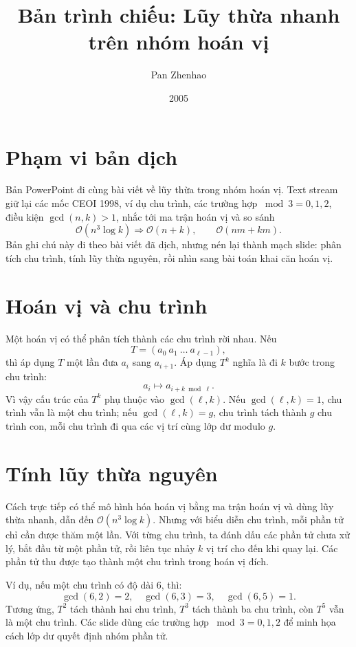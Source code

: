 \documentclass[11pt]{article}
\title{Bản trình chiếu: Lũy thừa nhanh trên nhóm hoán vị}
\author{Pan Zhenhao}
\date{2005}
\newcommand{\Oh}{\mathcal{O}}
\begin{document}
\maketitle


\section{Phạm vi bản dịch}

Bản PowerPoint đi cùng bài viết về lũy thừa trong nhóm hoán vị. Text stream
giữ lại các mốc CEOI 1998, ví dụ chu trình, các trường hợp
\(\bmod 3=0,1,2\), điều kiện \(\gcd(n,k)>1\), nhắc tới ma trận hoán vị và so
sánh
\[
  \Oh(n^3\log k)\Rightarrow \Oh(n+k),\qquad \Oh(nm+km).
\]
Bản ghi chú này đi theo bài viết đã dịch, nhưng nén lại thành mạch slide:
phân tích chu trình, tính lũy thừa nguyên, rồi nhìn sang bài toán khai căn
hoán vị.

\section{Hoán vị và chu trình}

Một hoán vị có thể phân tích thành các chu trình rời nhau. Nếu
\[
  T=(a_0\ a_1\ \ldots\ a_{\ell-1}),
\]
thì áp dụng \(T\) một lần đưa \(a_i\) sang \(a_{i+1}\). Áp dụng \(T^k\) nghĩa
là đi \(k\) bước trong chu trình:
\[
  a_i\mapsto a_{i+k\bmod \ell}.
\]
Vì vậy cấu trúc của \(T^k\) phụ thuộc vào \(\gcd(\ell,k)\). Nếu
\(\gcd(\ell,k)=1\), chu trình vẫn là một chu trình; nếu
\(\gcd(\ell,k)=g\), chu trình tách thành \(g\) chu trình con, mỗi chu trình đi
qua các vị trí cùng lớp dư modulo \(g\).

\section{Tính lũy thừa nguyên}

Cách trực tiếp có thể mô hình hóa hoán vị bằng ma trận hoán vị và dùng lũy
thừa nhanh, dẫn đến \(\Oh(n^3\log k)\). Nhưng với biểu diễn chu trình, mỗi
phần tử chỉ cần được thăm một lần. Với từng chu trình, ta đánh dấu các phần
tử chưa xử lý, bắt đầu từ một phần tử, rồi liên tục nhảy \(k\) vị trí cho đến
khi quay lại. Các phần tử thu được tạo thành một chu trình trong hoán vị
đích.

Ví dụ, nếu một chu trình có độ dài \(6\), thì:
\[
  \gcd(6,2)=2,\quad \gcd(6,3)=3,\quad \gcd(6,5)=1.
\]
Tương ứng, \(T^2\) tách thành hai chu trình, \(T^3\) tách thành ba chu trình,
còn \(T^5\) vẫn là một chu trình. Các slide dùng các trường hợp
\(\bmod 3=0,1,2\) để minh họa cách lớp dư quyết định nhóm phần tử.
\end{document}
